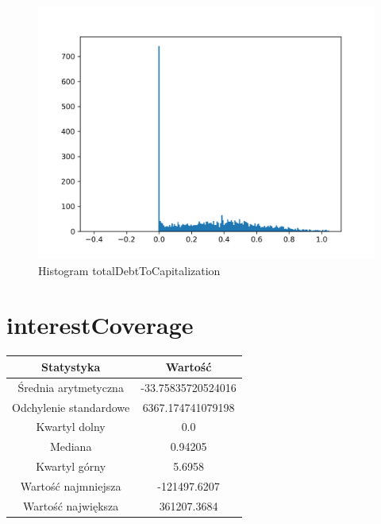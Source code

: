 \documentclass{article}
\begin{document}
\begin{figure}[h!]
    \includegraphics[width=\linewidth]{variables/totalDebtToCapitalization.png}
    \caption{Histogram totalDebtToCapitalization }
\end{figure}\section{ interestCoverage }

\begin{center}
    \begin{tabular}{|c | c|} 
    \hline
    Statystyka & Wartość \\
    \hline\hline
    Średnia arytmetyczna & -33.75835720524016 \\ 
    \hline
    Odchylenie standardowe & 6367.174741079198 \\
    \hline
    Kwartyl dolny & 0.0 \\
    \hline
    Mediana & 0.94205 \\
    \hline
    Kwartyl górny & 5.6958 \\
    \hline
    Wartość najmniejsza & -121497.6207 \\
    \hline
    Wartość największa & 361207.3684 \\
    \hline
   \end{tabular}
\end{center}
\end{document}
